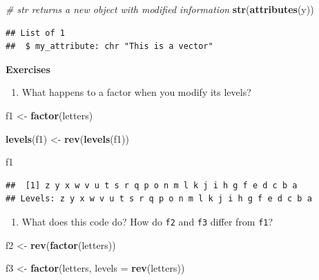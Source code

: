 \documentclass[
]{book}
\newenvironment{Shaded}{\begin{snugshade}}{\end{snugshade}}
\newcommand{\AttributeTok}[1]{\textcolor[rgb]{0.13,0.29,0.53}{#1}}
\newcommand{\CommentTok}[1]{\textcolor[rgb]{0.56,0.35,0.01}{\textit{#1}}}
\newcommand{\FunctionTok}[1]{\textcolor[rgb]{0.13,0.29,0.53}{\textbf{#1}}}
\newcommand{\NormalTok}[1]{#1}
\newcommand{\OtherTok}[1]{\textcolor[rgb]{0.56,0.35,0.01}{#1}}
\providecommand{\tightlist}{%
  \setlength{\itemsep}{0pt}\setlength{\parskip}{0pt}}
\begin{document}
\begin{Shaded}
\begin{Highlighting}[]
\CommentTok{\# str returns a new object with modified information}
\FunctionTok{str}\NormalTok{(}\FunctionTok{attributes}\NormalTok{(y))}
\end{Highlighting}
\end{Shaded}

\begin{verbatim}
## List of 1
##  $ my_attribute: chr "This is a vector"
\end{verbatim}

\textbf{Exercises}

\begin{enumerate}
\def\labelenumi{\arabic{enumi}.}
\tightlist
\item
  What happens to a factor when you modify its levels?
\end{enumerate}

\begin{Shaded}
\begin{Highlighting}[]
\NormalTok{f1 }\OtherTok{\textless{}{-}} \FunctionTok{factor}\NormalTok{(letters)}

\FunctionTok{levels}\NormalTok{(f1) }\OtherTok{\textless{}{-}} \FunctionTok{rev}\NormalTok{(}\FunctionTok{levels}\NormalTok{(f1))}

\NormalTok{f1}
\end{Highlighting}
\end{Shaded}

\begin{verbatim}
##  [1] z y x w v u t s r q p o n m l k j i h g f e d c b a
## Levels: z y x w v u t s r q p o n m l k j i h g f e d c b a
\end{verbatim}

\begin{enumerate}
\def\labelenumi{\arabic{enumi}.}
\setcounter{enumi}{1}
\tightlist
\item
  What does this code do? How do \texttt{f2} and \texttt{f3} differ from \texttt{f1}?
\end{enumerate}

\begin{Shaded}
\begin{Highlighting}[]
\NormalTok{f2 }\OtherTok{\textless{}{-}} \FunctionTok{rev}\NormalTok{(}\FunctionTok{factor}\NormalTok{(letters))}

\NormalTok{f3 }\OtherTok{\textless{}{-}} \FunctionTok{factor}\NormalTok{(letters, }\AttributeTok{levels =} \FunctionTok{rev}\NormalTok{(letters))}
\end{Highlighting}
\end{Shaded}
\end{document}
